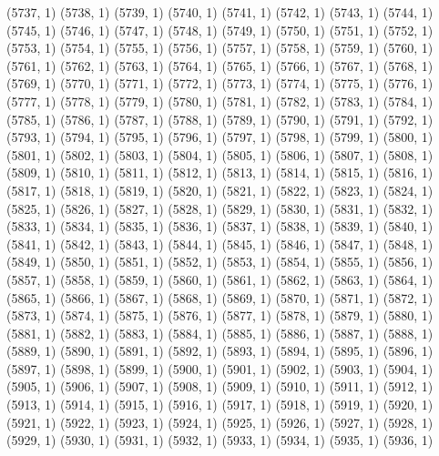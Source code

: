 {   (5737, 1)
   (5738, 1)
   (5739, 1)
   (5740, 1)
   (5741, 1)
   (5742, 1)
   (5743, 1)
   (5744, 1)
   (5745, 1)
   (5746, 1)
   (5747, 1)
   (5748, 1)
   (5749, 1)
   (5750, 1)
   (5751, 1)
   (5752, 1)
   (5753, 1)
   (5754, 1)
   (5755, 1)
   (5756, 1)
   (5757, 1)
   (5758, 1)
   (5759, 1)
   (5760, 1)
   (5761, 1)
   (5762, 1)
   (5763, 1)
   (5764, 1)
   (5765, 1)
   (5766, 1)
   (5767, 1)
   (5768, 1)
   (5769, 1)
   (5770, 1)
   (5771, 1)
   (5772, 1)
   (5773, 1)
   (5774, 1)
   (5775, 1)
   (5776, 1)
   (5777, 1)
   (5778, 1)
   (5779, 1)
   (5780, 1)
   (5781, 1)
   (5782, 1)
   (5783, 1)
   (5784, 1)
   (5785, 1)
   (5786, 1)
   (5787, 1)
   (5788, 1)
   (5789, 1)
   (5790, 1)
   (5791, 1)
   (5792, 1)
   (5793, 1)
   (5794, 1)
   (5795, 1)
   (5796, 1)
   (5797, 1)
   (5798, 1)
   (5799, 1)
   (5800, 1)
   (5801, 1)
   (5802, 1)
   (5803, 1)
   (5804, 1)
   (5805, 1)
   (5806, 1)
   (5807, 1)
   (5808, 1)
   (5809, 1)
   (5810, 1)
   (5811, 1)
   (5812, 1)
   (5813, 1)
   (5814, 1)
   (5815, 1)
   (5816, 1)
   (5817, 1)
   (5818, 1)
   (5819, 1)
   (5820, 1)
   (5821, 1)
   (5822, 1)
   (5823, 1)
   (5824, 1)
   (5825, 1)
   (5826, 1)
   (5827, 1)
   (5828, 1)
   (5829, 1)
   (5830, 1)
   (5831, 1)
   (5832, 1)
   (5833, 1)
   (5834, 1)
   (5835, 1)
   (5836, 1)
   (5837, 1)
   (5838, 1)
   (5839, 1)
   (5840, 1)
   (5841, 1)
   (5842, 1)
   (5843, 1)
   (5844, 1)
   (5845, 1)
   (5846, 1)
   (5847, 1)
   (5848, 1)
   (5849, 1)
   (5850, 1)
   (5851, 1)
   (5852, 1)
   (5853, 1)
   (5854, 1)
   (5855, 1)
   (5856, 1)
   (5857, 1)
   (5858, 1)
   (5859, 1)
   (5860, 1)
   (5861, 1)
   (5862, 1)
   (5863, 1)
   (5864, 1)
   (5865, 1)
   (5866, 1)
   (5867, 1)
   (5868, 1)
   (5869, 1)
   (5870, 1)
   (5871, 1)
   (5872, 1)
   (5873, 1)
   (5874, 1)
   (5875, 1)
   (5876, 1)
   (5877, 1)
   (5878, 1)
   (5879, 1)
   (5880, 1)
   (5881, 1)
   (5882, 1)
   (5883, 1)
   (5884, 1)
   (5885, 1)
   (5886, 1)
   (5887, 1)
   (5888, 1)
   (5889, 1)
   (5890, 1)
   (5891, 1)
   (5892, 1)
   (5893, 1)
   (5894, 1)
   (5895, 1)
   (5896, 1)
   (5897, 1)
   (5898, 1)
   (5899, 1)
   (5900, 1)
   (5901, 1)
   (5902, 1)
   (5903, 1)
   (5904, 1)
   (5905, 1)
   (5906, 1)
   (5907, 1)
   (5908, 1)
   (5909, 1)
   (5910, 1)
   (5911, 1)
   (5912, 1)
   (5913, 1)
   (5914, 1)
   (5915, 1)
   (5916, 1)
   (5917, 1)
   (5918, 1)
   (5919, 1)
   (5920, 1)
   (5921, 1)
   (5922, 1)
   (5923, 1)
   (5924, 1)
   (5925, 1)
   (5926, 1)
   (5927, 1)
   (5928, 1)
   (5929, 1)
   (5930, 1)
   (5931, 1)
   (5932, 1)
   (5933, 1)
   (5934, 1)
   (5935, 1)
   (5936, 1)
}
